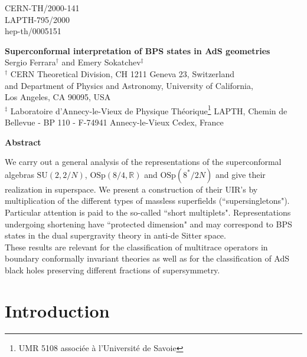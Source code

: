 \documentclass[a4paper,12pt]{article}
\begin{document}
\begin{titlepage}
\begin{flushright}
CERN-TH/2000-141\\ LAPTH-795/2000 \\ hep-th/0005151 
\end{flushright}
\vspace{.5cm} 
\begin{center}
{\Large\bf Superconformal interpretation of BPS states in AdS 
geometries}\\ \vfill {\large  Sergio Ferrara$^\dagger$ and Emery 
Sokatchev$^\ddagger$ }\\ \vfill  \vspace{6pt} $^\dagger$ CERN 
Theoretical Division, CH 1211 Geneva 23, Switzerland 
\\ and 
Department of Physics and Astronomy, University of California, \\ 
Los Angeles, CA 90095, USA 
\\ \vspace{6pt}
$^\ddagger$ Laboratoire d'Annecy-le-Vieux de Physique 
Th\'{e}orique\footnote[1]{UMR 5108 associ{\'e}e {\`a} 
 l'Universit{\'e} de Savoie} LAPTH, Chemin
de Bellevue - BP 110 - F-74941 Annecy-le-Vieux Cedex, France 


\end{center}
\vfill 

\begin{center}
{\bf Abstract} 
\end{center}
{\small We carry out a general analysis of the representations of 
the superconformal algebras $\mbox{SU}(2,2/N)$, 
$\mbox{OSp}(8/4,\mathbb{R})$ and $\mbox{OSp}(8^*/2N)$ and give 
their realization in superspace. We present a construction of 
their UIR's by multiplication of the different types of massless 
superfields (``supersingletons"). 
\\ Particular attention is paid to the so-called ``short multiplets". 
Representations undergoing shortening have ``protected dimension" 
and may correspond to BPS states in the dual supergravity theory in 
anti-de Sitter space.\\ These results are relevant for the 
classification of multitrace operators in boundary conformally 
invariant theories as well as for the classification of AdS black 
holes preserving different fractions of supersymmetry.} 
\end{titlepage}


\section{Introduction}
\end{document}
